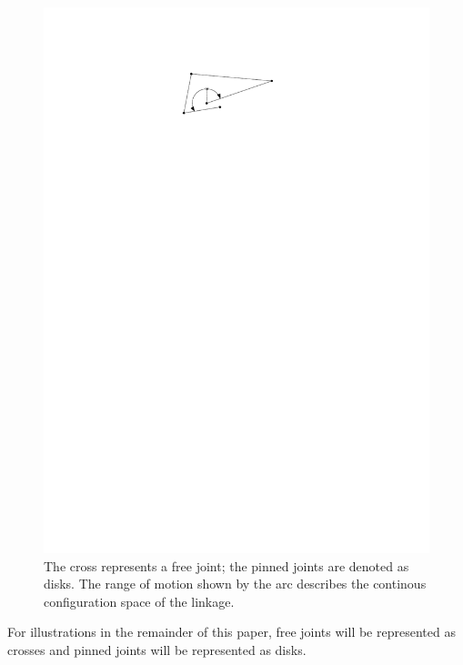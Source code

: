 \begin{figure}[h]
\begin{center}
\includegraphics{graphics/freeJointPinnedJoint.pdf}
\end{center} 
\caption{The cross represents a free joint; the pinned joints are denoted as disks.  The range of motion shown by the arc describes the continous configuration space of the linkage.}
\end{figure} 

For illustrations in the remainder of this paper, free joints will be represented as crosses and pinned joints will be represented as disks.
 